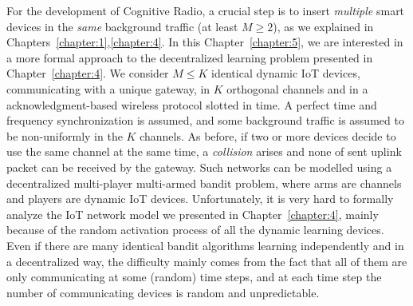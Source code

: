 


For the development of Cognitive Radio, a crucial step is to insert \emph{multiple} smart devices in the \emph{same} background traffic (at least $M \geq 2$), as we explained in Chapters~\ref{chapter:1},\ref{chapter:4}.
%
In this Chapter~\ref{chapter:5}, we are interested in a more formal approach to the decentralized learning problem presented in Chapter~\ref{chapter:4}.
We consider $M \leq K$ identical dynamic IoT devices, communicating with a unique gateway, in $K$ orthogonal channels and in a acknowledgment-based wireless protocol slotted in time.
A perfect time and frequency synchronization is assumed,
and some \iid{} background traffic is assumed to be non-uniformly in the $K$ channels.
As before, if two or more devices decide to use the same channel at the same time, a \emph{collision} arises and none of sent uplink packet can be received by the gateway.
%
Such networks can be modelled using a decentralized multi-player multi-armed bandit problem, where arms are channels and players are dynamic IoT devices.
Unfortunately, it is very hard to formally analyze the IoT network model we presented in Chapter~\ref{chapter:4}, mainly because of the random activation process of all the dynamic learning devices.
Even if there are many identical bandit algorithms learning independently and in a decentralized way, the difficulty mainly comes from the fact that all of them are only communicating at some (random) time steps, and at each time step the number of communicating devices is random and unpredictable.

